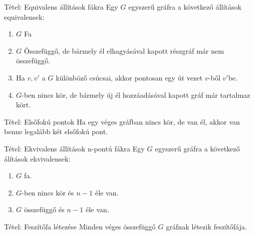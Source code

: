 \documentclass{beamer}
\begin{document}
\begin{frame}

\begin{block}{Tétel: Equivalens állítások fákra}
Egy $G$ egyszerű gráfra a következő állítások equivalensek:

\begin{enumerate}
\item $G$ Fa
\item $G$ Összefüggő, de bármely él elhagyásával kapott részgráf már nem összefüggő.
\item Ha $v, v'$ a $G$ különböző csúcsai, akkor pontosan egy út vezet $v$-ből $v'$be.
\item $G$-ben nincs kör, de bármely új él hozzáadásával kapott gráf már tartalmaz kört.
\end{enumerate}

\end{block}


\begin{block}{Tétel: Elsőfokú pontok}
Ha egy véges gráfban nincs kör, de van él, akkor van benne legalább két elsőfokú pont.

\end{block}

\end{frame}

\begin{frame} 

\begin{block}{Tétel: Ekvivalens állítások n-pontú fákra}
Egy $G$ egyszerű gráfra a következő álítások ekvivalensek:

\begin{enumerate}
\item $G$ fa.
\item $G$-ben nincs kör és $n - 1$ éle van.
\item $G$ összefüggő és $n - 1$ éle van.
\end{enumerate}

\end{block}

\begin{block}{Tétel: Feszítőfa létezése}
Minden véges összefüggő $G$ gráfnak létezik feszítőfája.

\end{block}

\end{frame}
\end{document}
